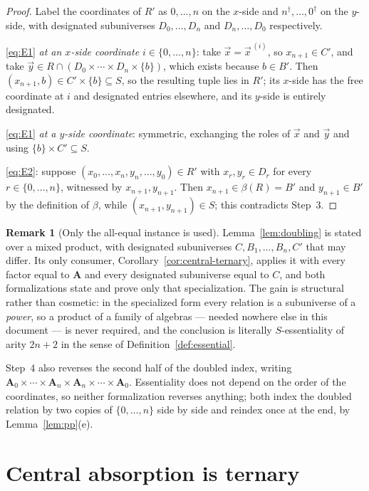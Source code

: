 \documentclass[11pt]{article}
\theoremstyle{mainplain}
\theoremstyle{mainroman}
\theoremstyle{definition}
\newtheorem{remark}[theorem]{Remark}
\numberwithin{equation}{section}
\newcommand{\bA}{\mathbf A}
\begin{document}
\begin{proof}
Label the coordinates of $R'$ as $0,\dots,n$ on the $x$-side and
$n^{\dagger},\dots,0^{\dagger}$ on the $y$-side, with designated subuniverses
$D_0,\dots,D_n$ and $D_n,\dots,D_0$ respectively.

\eqref{eq:E1} \emph{at an $x$-side coordinate $i\in\{0,\dots,n\}$}: take
$\vec x=\vec x^{\,(i)}$, so $x_{n+1}\in C'$, and take
$\vec y\in R\cap(D_0\times\cdots\times D_n\times\{b\})$, which exists
because $b\in B'$. Then $(x_{n+1},b)\in C'\times\{b\}\subseteq S$, so the
resulting tuple lies in $R'$; its $x$-side has the free coordinate at $i$ and
designated entries elsewhere, and its $y$-side is entirely designated.

\eqref{eq:E1} \emph{at a $y$-side coordinate}: symmetric, exchanging the roles
of $\vec x$ and $\vec y$ and using $\{b\}\times C'\subseteq S$.

\eqref{eq:E2}: suppose $(x_0,\dots,x_n,y_n,\dots,y_0)\in R'$ with
$x_r,y_r\in D_r$ for every $r\in\{0,\dots,n\}$, witnessed by
$x_{n+1},y_{n+1}$. Then $x_{n+1}\in\beta(R)=B'$ and $y_{n+1}\in B'$ by the
definition of $\beta$, while $(x_{n+1},y_{n+1})\in S$; this contradicts Step~3.
\end{proof}

\begin{remark}[Only the all-equal instance is used]\label{rem:doubling-specialized}
Lemma~\ref{lem:doubling} is stated over a mixed product, with designated
subuniverses $C,B_1,\dots,B_n,C'$ that may differ. Its only consumer,
Corollary~\ref{cor:central-ternary}, applies it with every factor equal to
$\bA$ and every designated subuniverse equal to $C$, and both formalizations
state and prove only that specialization. The gain is structural rather than
cosmetic: in the specialized form every relation is a subuniverse of a
\emph{power}, so a product of a family of algebras --- needed nowhere else in
this document --- is never required, and the conclusion is literally
$S$-essentiality of arity $2n+2$ in the sense of
Definition~\ref{def:essential}.

Step~4 also reverses the second half of the doubled index, writing
$\bA_0\times\cdots\times\bA_n\times\bA_n\times\cdots\times\bA_0$. Essentiality
does not depend on the order of the coordinates, so neither formalization
reverses anything; both index the doubled relation by two copies of
$\{0,\dots,n\}$ side by side and reindex once at the end, by
Lemma~\ref{lem:pp}(e).
\end{remark}

\section{Central absorption is ternary}\label{sec:ternary}
\end{document}
